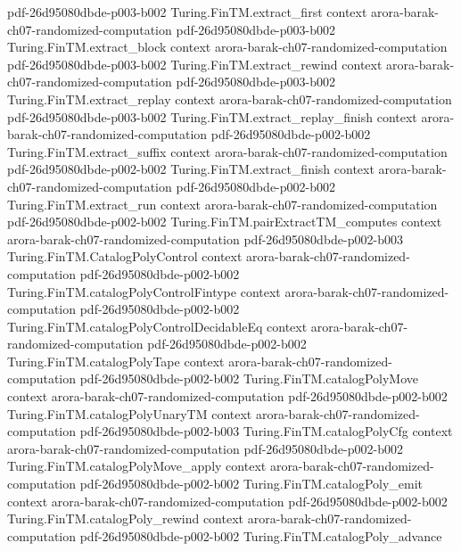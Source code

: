 \begin{theorem}
  {pdf-26d95080dbde-p003-b002}
\proofstep
  {Turing.FinTM.extract_first}
  {context}
  {arora-barak-ch07-randomized-computation}
  {pdf-26d95080dbde-p003-b002}
\proofstep
  {Turing.FinTM.extract_block}
  {context}
  {arora-barak-ch07-randomized-computation}
  {pdf-26d95080dbde-p003-b002}
\proofstep
  {Turing.FinTM.extract_rewind}
  {context}
  {arora-barak-ch07-randomized-computation}
  {pdf-26d95080dbde-p003-b002}
\proofstep
  {Turing.FinTM.extract_replay}
  {context}
  {arora-barak-ch07-randomized-computation}
  {pdf-26d95080dbde-p003-b002}
\proofstep
  {Turing.FinTM.extract_replay_finish}
  {context}
  {arora-barak-ch07-randomized-computation}
  {pdf-26d95080dbde-p002-b002}
\proofstep
  {Turing.FinTM.extract_suffix}
  {context}
  {arora-barak-ch07-randomized-computation}
  {pdf-26d95080dbde-p002-b002}
\proofstep
  {Turing.FinTM.extract_finish}
  {context}
  {arora-barak-ch07-randomized-computation}
  {pdf-26d95080dbde-p002-b002}
\proofstep
  {Turing.FinTM.extract_run}
  {context}
  {arora-barak-ch07-randomized-computation}
  {pdf-26d95080dbde-p002-b002}
\proofstep
  {Turing.FinTM.pairExtractTM_computes}
  {context}
  {arora-barak-ch07-randomized-computation}
  {pdf-26d95080dbde-p002-b003}
\proofstep
  {Turing.FinTM.CatalogPolyControl}
  {context}
  {arora-barak-ch07-randomized-computation}
  {pdf-26d95080dbde-p002-b002}
\proofstep
  {Turing.FinTM.catalogPolyControlFintype}
  {context}
  {arora-barak-ch07-randomized-computation}
  {pdf-26d95080dbde-p002-b002}
\proofstep
  {Turing.FinTM.catalogPolyControlDecidableEq}
  {context}
  {arora-barak-ch07-randomized-computation}
  {pdf-26d95080dbde-p002-b002}
\proofstep
  {Turing.FinTM.catalogPolyTape}
  {context}
  {arora-barak-ch07-randomized-computation}
  {pdf-26d95080dbde-p002-b002}
\proofstep
  {Turing.FinTM.catalogPolyMove}
  {context}
  {arora-barak-ch07-randomized-computation}
  {pdf-26d95080dbde-p002-b002}
\proofstep
  {Turing.FinTM.catalogPolyUnaryTM}
  {context}
  {arora-barak-ch07-randomized-computation}
  {pdf-26d95080dbde-p002-b003}
\proofstep
  {Turing.FinTM.catalogPolyCfg}
  {context}
  {arora-barak-ch07-randomized-computation}
  {pdf-26d95080dbde-p002-b002}
\proofstep
  {Turing.FinTM.catalogPolyMove_apply}
  {context}
  {arora-barak-ch07-randomized-computation}
  {pdf-26d95080dbde-p002-b002}
\proofstep
  {Turing.FinTM.catalogPoly_emit}
  {context}
  {arora-barak-ch07-randomized-computation}
  {pdf-26d95080dbde-p002-b002}
\proofstep
  {Turing.FinTM.catalogPoly_rewind}
  {context}
  {arora-barak-ch07-randomized-computation}
  {pdf-26d95080dbde-p002-b002}
\proofstep
  {Turing.FinTM.catalogPoly_advance}

\end{theorem}

